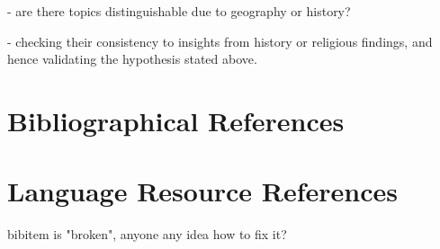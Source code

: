 \documentclass[a4paper,10pt]{article}
\newcommand{\TODO}[1]{\begingroup\color{red}#1\endgroup}
\begin{document}
\TODO{- are there topics distinguishable due to geography or history?}

\TODO{- checking their consistency to insights from history or religious findings, and hence validating the hypothesis stated above.}



\section{Bibliographical References}
\label{main:ref}





\section{Language Resource References}
\label{lr:ref}
\TODO{bibitem is "broken", anyone any idea how to fix it?}
\end{document}
